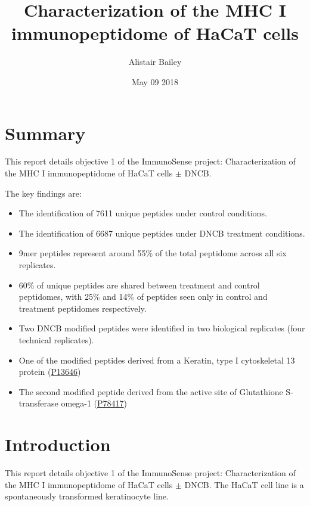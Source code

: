 \documentclass[12pt,]{book}
\title{Characterization of the MHC I immunopeptidome of HaCaT cells}
\author{Alistair Bailey}
\date{May 09 2018}
\providecommand{\tightlist}{%
  \setlength{\itemsep}{0pt}\setlength{\parskip}{0pt}}
\begin{document}
\maketitle

{
\setcounter{tocdepth}{1}
\tableofcontents
}
\listoftables
\listoffigures
\chapter*{Summary}\label{summary}

This report details objective 1 of the ImmunoSense project:
Characterization of the MHC I immunopeptidome of HaCaT cells \(\pm\)
DNCB.

The key findings are:

\begin{itemize}
\tightlist
\item
  The identification of 7611 unique peptides under control conditions.
\item
  The identification of 6687 unique peptides under DNCB treatment
  conditions.
\item
  9mer peptides represent around 55\% of the total peptidome across all
  six replicates.
\item
  60\% of unique peptides are shared between treatment and control
  peptidomes, with 25\% and 14\% of peptides seen only in control and
  treatment peptidomes respectively.
\item
  Two DNCB modified peptides were identified in two biological
  replicates (four technical replicates).
\item
  One of the modified peptides derived from a Keratin, type I
  cytoskeletal 13 protein
  (\href{https://www.uniprot.org/uniprot/P13646}{P13646})
\item
  The second modified peptide derived from the active site of
  Glutathione S-transferase omega-1
  (\href{https://www.uniprot.org/uniprot/P78417}{P78417})
\end{itemize}

\chapter{Introduction}\label{introduction}

This report details objective 1 of the ImmunoSense project:
Characterization of the MHC I immunopeptidome of HaCaT cells
\citep{boukamp1988} \(\pm\) DNCB. The HaCaT cell line is a spontaneously
transformed keratinocyte line.
\end{document}
